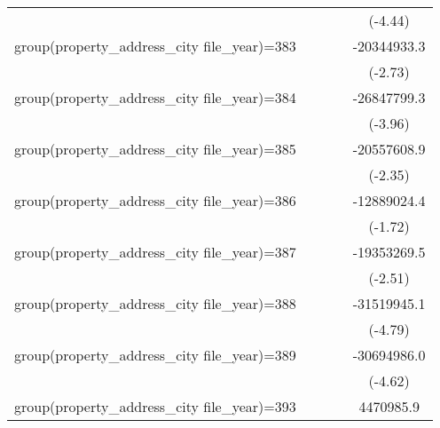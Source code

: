 {\begin{tabular}{l*{4}{c}}
                    &                     &                     &                     &     (-4.44)         \\
\addlinespace
group(property\_address\_city file\_year)=383&                     &                     &                     & -20344933.3\sym{**} \\
                    &                     &                     &                     &     (-2.73)         \\
\addlinespace
group(property\_address\_city file\_year)=384&                     &                     &                     & -26847799.3\sym{***}\\
                    &                     &                     &                     &     (-3.96)         \\
\addlinespace
group(property\_address\_city file\_year)=385&                     &                     &                     & -20557608.9\sym{*}  \\
                    &                     &                     &                     &     (-2.35)         \\
\addlinespace
group(property\_address\_city file\_year)=386&                     &                     &                     & -12889024.4         \\
                    &                     &                     &                     &     (-1.72)         \\
\addlinespace
group(property\_address\_city file\_year)=387&                     &                     &                     & -19353269.5\sym{*}  \\
                    &                     &                     &                     &     (-2.51)         \\
\addlinespace
group(property\_address\_city file\_year)=388&                     &                     &                     & -31519945.1\sym{***}\\
                    &                     &                     &                     &     (-4.79)         \\
\addlinespace
group(property\_address\_city file\_year)=389&                     &                     &                     & -30694986.0\sym{***}\\
                    &                     &                     &                     &     (-4.62)         \\
\addlinespace
group(property\_address\_city file\_year)=393&                     &                     &                     &   4470985.9         \\

\end{tabular}}
